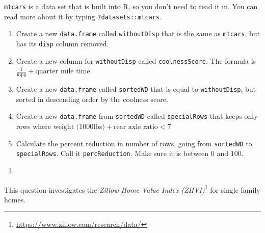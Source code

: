 \documentclass[12pt,krantz2]{krantz}
\providecommand{\tightlist}{%
  \setlength{\itemsep}{0pt}\setlength{\parskip}{0pt}}
\renewcommand{\href}[2]{#2\footnote{\url{#1}}}
\begin{document}
\texttt{mtcars} is a data set that is built into R, so you don't need to read it in. You can read more about it by typing \texttt{?datasets::mtcars}.

\begin{enumerate}
\def\labelenumi{\alph{enumi})}
\tightlist
\item
  Create a new \texttt{data.frame} called \texttt{withoutDisp} that is the same as \texttt{mtcars}, but has its \texttt{disp} column removed.
\item
  Create a new column for \texttt{withoutDisp} called \texttt{coolnessScore}. The formula is \(\frac{1}{\text{mpg}} + \text{quarter mile time}\).
\item
  Create a new \texttt{data.frame} called \texttt{sortedWD} that is equal to \texttt{withoutDisp}, but sorted in descending order by the coolness score.
\item
  Create a new \texttt{data.frame} from \texttt{sortedWD} called \texttt{specialRows} that keeps only rows where \(\text{weight (1000lbs)} + \text{rear axle ratio} < 7\)
\item
  Calculate the percent reduction in number of rows, going from \texttt{sortedWD} to \texttt{specialRows}. Call it \texttt{percReduction}. Make sure it is between \(0\) and \(100\).
\end{enumerate}

\begin{enumerate}
\def\labelenumi{\arabic{enumi}.}
\setcounter{enumi}{2}
\item
\end{enumerate}

This question investigates the \href{https://www.zillow.com/research/data/}{\emph{Zillow Home Value Index (ZHVI)}} for single family homes.
\end{document}

